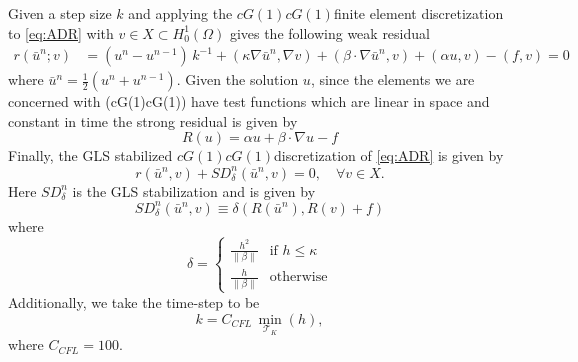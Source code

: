     Given a step size $k$ and applying the $cG(1)cG(1)$finite element
    discretization to \eqref{eq:ADR} with $v \in X \subset H^1_0(\Omega)$ gives
    the following weak residual
    \begin{equation}
    \begin{split}
        r(\bar{u}^n; v) &= \left(u^n - u^{n-1}\right)\,k^{-1}
            + (\kappa \nabla \bar{u}^n, \nabla v)
            + (\beta \cdot \nabla \bar{u}^n, v) + (\alpha u, v) - (f, v) = 0
    \end{split}
    \label{eqn:WeakADR}
    \end{equation}
    where $\bar{u}^n = \frac{1}{2}\left(u^n + u^{n-1}\right)$. Given the
    solution $u$, since the elements we are concerned with (cG(1)cG(1)) have
    test functions which are linear in space and constant in time the strong
    residual is given by
    \begin{equation}
        R(u) = \alpha u + \beta \cdot \nabla u - f
    \label{eqn:StrongADR}
    \end{equation}
    Finally, the GLS stabilized $cG(1)cG(1)$discretization of \eqref{eq:ADR} is
    given by
    \begin{equation}
        r(\bar{u}^n,v) + SD_{\delta}^n(\bar{u}^n,v) = 0,
            \quad \forall v \in X.
        \label{eqn:G2ADR}
    \end{equation}
    Here $SD_{\delta}^n$ is the GLS stabilization and is given by
    \begin{equation}
        SD_{\delta}^n(\bar{u}^n, v) \equiv \delta \left(R(\bar{u}^n), R(v)
            + f\right)
    \label{eq:ADRStabilization}
    \end{equation}
    where
    \begin{equation}
        \delta = \begin{cases}
            \frac{h^2}{\|\beta\|} & \text{if } h \le \kappa \\
            \frac{h}{\|\beta\|} & \text{otherwise}
        \end{cases}
        \label{eq:ADRdelta}
    \end{equation}
    Additionally, we take the time-step to be
    \begin{equation*}
        k = C_{CFL}\, \min_{\mathcal{T}_K}(h),
    \end{equation*}
    where $C_{CFL}=100$.


